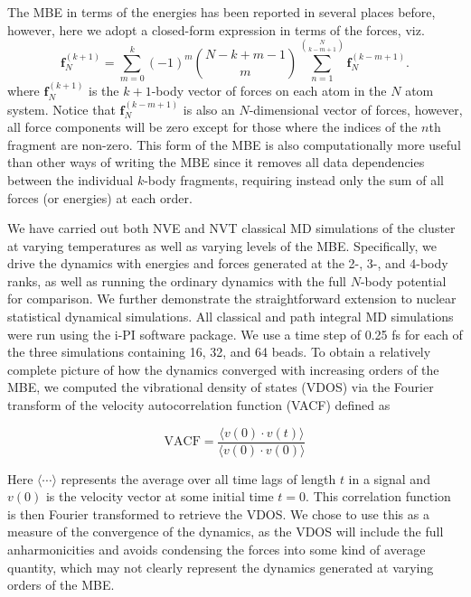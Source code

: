 \documentclass[11pt, proquest]{uwthesis}[2020/02/24]
\let\ce\ch
\begin{document}
\par The MBE in terms of the energies has been reported in several places before,\autocite{herbert_fantasy_2019,heindel_many-body_2020,xantheas_ab_1994} however, here we adopt a closed-form expression in terms of the forces,\autocite{lao_understanding_2016} viz.
\begin{equation}
    \mathbf{f}_N^{(k+1)}=\sum_{m=0}^k(-1)^{m}\binom{N-k+m-1}{m}\sum_{n=1}^{\binom{N}{k-m+1}}\mathbf{f}_N^{(k-m+1)}.
\end{equation}
where $\mathbf{f}_N^{(k+1)}$ is the $k+1$-body vector of forces on each atom in the $N$ atom system. Notice that $\mathbf{f}_N^{(k-m+1)}$ is also an $N$-dimensional vector of forces, however, all force components will be zero except for those where the indices of the $n$th fragment are non-zero. This form of the MBE is also computationally more useful than other ways of writing the MBE since it removes all data dependencies between the individual $k$-body fragments, requiring instead only the sum of all forces (or energies) at each order.

\par We have carried out both NVE and NVT classical MD simulations of the \ce{(H2O)_{10}} cluster at varying temperatures as well as varying levels of the MBE. Specifically, we drive the dynamics with energies and forces generated at the 2-, 3-, and 4-body ranks, as well as running the ordinary dynamics with the full $N$-body potential for comparison. We further demonstrate the straightforward extension to nuclear statistical dynamical simulations. All classical and path integral MD simulations were run using the i-PI software package.\autocite{kapil_i-pi_2019} We use a time step of 0.25 fs for each of the three simulations containing 16, 32, and 64 beads.
To obtain a relatively complete picture of how the dynamics converged with increasing orders of the MBE, we computed the vibrational density of states (VDOS) via the Fourier transform of the velocity autocorrelation function (VACF) defined as

\begin{equation}
    \mathrm{VACF}=\frac{\langle v(0)\cdot v(t)\rangle}{\langle v(0)\cdot v(0)\rangle}
\end{equation}

\par Here $\langle\cdots\rangle$ represents the average over all time lags of length $t$ in a signal and $v(0)$ is the velocity vector at some initial time $t=0$. This correlation function is then Fourier transformed to retrieve the VDOS. We chose to use this as a measure of the convergence of the dynamics, as the VDOS will include the full anharmonicities and avoids condensing the forces into some kind of average quantity, which may not clearly represent the dynamics generated at varying orders of the MBE.
\end{document}
